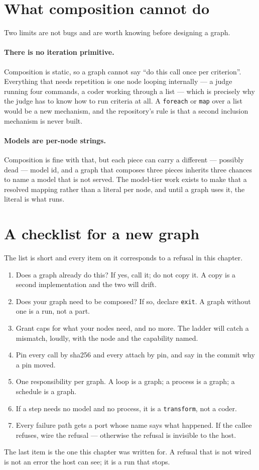 \section{What composition cannot do}

Two limits are not bugs and are worth knowing before designing a graph.

\paragraph{There is no iteration primitive.} Composition is static, so a graph cannot say
\enquote{do this call once per criterion}. Everything that needs repetition is one node looping
internally --- a judge running four commands, a coder working through a list --- which is precisely
why the judge has to know how to run criteria at all. A \texttt{foreach} or \texttt{map} over a
list would be a new mechanism, and the repository's rule is that a second inclusion mechanism is
never built. 
\paragraph{Models are per-node strings.} Composition is fine with that, but each piece can carry a
different --- possibly dead --- model id, and a graph that composes three pieces inherits three
chances to name a model that is not served. The model-tier work exists to make that a resolved
mapping rather than a literal per node, and until a graph uses it, the literal is what runs.

\section{A checklist for a new graph}

The list is short and every item on it corresponds to a refusal in this chapter.

\begin{enumerate}
	\item Does a graph already do this? If yes, call it; do not copy it. A copy is a second
	implementation and the two will drift.
	\item Does your graph need to be composed? If so, declare \texttt{exit}. A graph without one is a
	run, not a part.
	\item Grant caps for what your nodes need, and no more. The ladder will catch a mismatch, loudly,
	with the node and the capability named.
	\item Pin every call by sha256 and every attach by pin, and say in the commit why a pin moved.
	\item One responsibility per graph. A loop is a graph; a process is a graph; a schedule is a
	graph.
	\item If a step needs no model and no process, it is a \texttt{transform}, not a coder.
	\item Every failure path gets a port whose name says what happened. If the callee refuses, wire
	the refusal --- otherwise the refusal is invisible to the host.
\end{enumerate}

The last item is the one this chapter was written for. A refusal that is not wired is not an error
the host can see; it is a run that stops.
